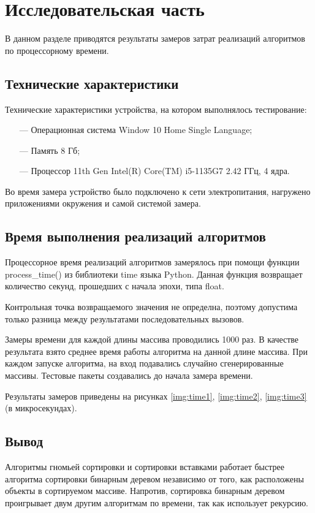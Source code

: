 \chapter{Исследовательская часть}

В данном разделе приводятся результаты замеров затрат реализаций алгоритмов по процессорному времени.

\section{Технические характеристики}

Технические характеристики устройства, на котором выполнялось тестирование:

\begin{itemize}
	\item[---] Операционная система Window 10 Home Single Language;
	\item[---] Память 8 Гб;
	\item[---] Процессор 11th Gen Intel(R) Core(TM) i5-1135G7 2.42 ГГц, 4 ядра.
\end{itemize}

Во время замера устройство было подключено к сети электропитания, нагружено приложениями окружения и самой системой замера.

\section{Время выполнения реализаций алгоритмов}

Процессорное время реализаций алгоритмов замерялось при помощи функции process\_time() из библиотеки time языка Python. Данная функция возвращает количество секунд, прошедших с начала эпохи, типа float.

Контрольная точка возвращаемого значения не определна, поэтому допустима только разница между результатами последовательных вызовов.

Замеры времени для каждой длины массива проводились 1000 раз. В качестве результата взято среднее время работы алгоритма на данной длине массива. При каждом запуске алгоритма, на вход подавались случайно сгенерированные массивы. Тестовые пакеты создавались до начала замера времени.

Результаты замеров приведены на рисунках \ref{img:time1}, \ref{img:time2}, \ref{img:time3} (в микросекундах).


\clearpage

\section*{Вывод}

Алгоритмы гномьей сортировки и сортировки вставками работает быстрее алгоритма сортировки бинарным деревом независимо от того, как расположены объекты в сортируемом массиве. Напротив, сортировка бинарным деревом проигрывает двум другим алгоритмам по времени, так как использует рекурсию.
